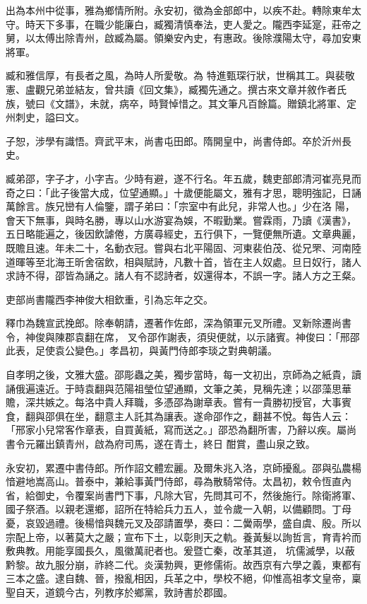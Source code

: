 \begin{pinyinscope}
 出為本州中從事，雅為鄉情所附。永安初，徵為金部郎中，以疾不赴。轉除東牟太守。時天下多事，在職少能廉白，臧獨清慎奉法，吏人愛之。隴西李延寔，莊帝之舅，以太傅出除青州，啟臧為屬。領樂安內史，有惠政。後除濮陽太守，尋加安東將軍。



 臧和雅信厚，有長者之風，為時人所愛敬。為
 特進甄琛行狀，世稱其工。與裴敬憲、盧觀兄弟並結友，曾共讀《回文集》，臧獨先通之。撰古來文章并敘作者氏族，號曰《文譜》，未就，病卒，時賢悼惜之。其文筆凡百餘篇。贈鎮北將軍、定州刺史，謚曰文。



 子恕，涉學有識悟。齊武平末，尚書屯田郎。隋開皇中，尚書侍郎。卒於沂州長史。



 臧弟邵，字子才，小字吉。少時有避，遂不行名。年五歲，魏吏部郎清河崔亮見而奇之曰：「此子後當大成，位望通顯。」十歲便能屬文，雅有才思，聰明強記，日誦萬餘言。族兄巒有人倫鑒，謂子弟曰：「宗室中有此兒，非常人也。」少在洛
 陽，會天下無事，與時名勝，專以山水游宴為娛，不暇勤業。嘗霖雨，乃讀《漢書》，五日略能遍之，後因飲謔倦，方廣尋經史，五行俱下，一覽便無所遺。文章典麗，既贍且速。年未二十，名動衣冠。嘗與右北平陽固、河東裴伯茂、從兄罘、河南陸道暉等至北海王昕舍宿飲，相與賦詩，凡數十首，皆在主人奴處。旦日奴行，諸人求詩不得，邵皆為誦之。諸人有不認詩者，奴還得本，不誤一字。諸人方之王粲。



 吏部尚書隴西李神俊大相欽重，引為忘年之交。



 釋巾為魏宣武挽郎。除奉朝請，遷著作佐郎，深為領軍元叉所禮。叉新除遷尚書令，神俊與陳郡袁翻在席，
 叉令邵作謝表，須臾便就，以示諸賓。神俊曰：「邢邵此表，足使袁公變色。」孝昌初，與黃門侍郎李琰之對典朝議。



 自孝明之後，文雅大盛。邵彫蟲之美，獨步當時，每一文初出，京師為之紙貴，讀誦俄遍遠近。于時袁翻與范陽祖瑩位望通顯，文筆之美，見稱先達；以邵藻思華贍，深共嫉之。每洛中貴人拜職，多憑邵為謝章表。嘗有一貴勝初授官，大事賓食，翻與邵俱在坐，翻意主人託其為讓表。遂命邵作之，翻甚不悅。每告人云：「邢家小兒常客作章表，自買黃紙，寫而送之。」邵恐為翻所害，乃辭以疾。屬尚書令元羅出鎮青州，啟為府司馬，遂在青土，終日
 酣賞，盡山泉之致。



 永安初，累遷中書侍郎。所作詔文體宏麗。及爾朱兆入洛，京師擾亂。邵與弘農楊愔避地嵩高山。普泰中，兼給事黃門侍郎，尋為散騎常侍。太昌初，敕令恆直內省，給御史，令覆案尚書門下事，凡除大官，先問其可不，然後施行。除衛將軍、國子祭酒。以親老還鄉，詔所在特給兵力五人，並令歲一入朝，以備顧問。丁母憂，哀毀過禮。後楊愔與魏元叉及邵請置學，奏曰：二黌兩學，盛自虞、殷。所以宗配上帝，以著莫大之嚴；宣布下土，以彰則天之軌。養黃髮以詢哲言，育青衿而敷典教。用能享國長久，風徽萬祀者也。爰暨亡秦，改革其道，
 坑儒滅學，以蔽黔黎。故九服分崩，祚終二代。炎漢勃興，更修儒術。故西京有六學之義，東都有三本之盛。逮自魏、晉，撥亂相因，兵革之中，學校不絕，仰惟高祖孝文皇帝，稟聖自天，道鏡今古，列教序於鄉黨，敦詩書於郡國。




\end{pinyinscope}
